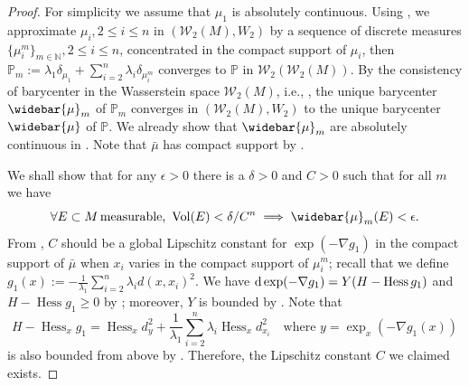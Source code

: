 \begin{proof}

	For simplicity we assume that $\mu_1$ is absolutely continuous.
	Using , we
	approximate $\mu_i, 2 \leq i \leq n $ in $(\mathcal{W}_2(M), W_2)$ by
	a sequence of discrete measures $\{\mu_i^{m}\}_{m \in \mathbb{N}}, 2 \leq i \leq n$,
	concentrated in the compact support of $\mu_i$,
	then $\mathbb{P}_m := \lambda_1 \delta_{\mu_1} + \sum_{i = 2}^n \lambda_i \delta_{\mu_i^m}$ converges to $\mathbb{P}$
	in $\mathcal{W}_2(\mathcal{W}_2(M))$.
	By the consistency of barycenter in the Wasserstein space $\mathcal{W}_2(M)$, i.e.,
	,
	the unique barycenter $\widebar{\mu}_m$ of $\mathbb{P}_m$
	converges in $(\mathcal{W}_2(M), W_2)$ to the unique barycenter $\widebar{\mu}$ of $\mathbb{P}$.
	We already show that $\widebar{\mu}_m$ are absolutely continuous in .
	Note that $\bar{\mu}$ has compact support by .

	We shall show that
	for any $\epsilon > 0$ there is a $\delta > 0$ and $C >0 $ such that for all $m$ we have
	\begin{equation}
		\label{equa:absolutely_continous}
		\forall E \subset M \, \text{measurable, } \operatorname{Vol}(E) < \delta / C^n
		\implies \widebar{\mu}_m(E) < \epsilon.
	\end{equation}
	From ,
	$C$ should be a global Lipschitz constant for $\exp(-\nabla g_1)$
	in the compact support of $\bar{\mu}$ when $x_i$ varies in the compact support of $\mu_i^m$;
	recall that we define $g_1(x):= - \frac{1}{\lambda_1} \sum_{i=2}^n \lambda_i d(x, x_i)^2$.
	We have $\operatorname{d} \exp(-\nabla g_1) = Y ( H - \operatorname{Hess}g_1)$
	and $H-\operatorname{Hess} g_1 \geq 0$
	by ;
	moreover, $Y$ is bounded by .
	Note that
	\[
		H-\operatorname{Hess}_x g_1=
		\operatorname{Hess}_xd^2_y + \frac{1}{\lambda_1} \sum_{i=2}^n \lambda_i \operatorname{Hess}_x d^2_{x_i}
		\quad \text{where }y=\exp_x( -\nabla g_1(x))
	\]
	is also bounded from above by .
	Therefore, the Lipschitz constant $C$ we claimed exists.


\end{proof}
